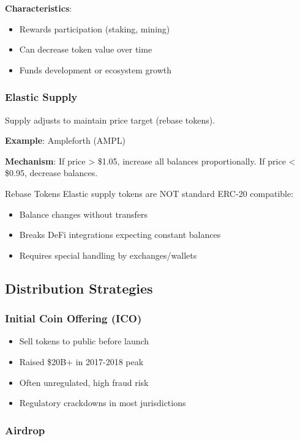 \documentclass[11pt,a4paper]{article}
\begin{document}
\textbf{Characteristics}:
\begin{itemize}
  \item Rewards participation (staking, mining)
  \item Can decrease token value over time
  \item Funds development or ecosystem growth
\end{itemize}

\subsubsection{Elastic Supply}

Supply adjusts to maintain price target (rebase tokens).

\textbf{Example}: Ampleforth (AMPL)

\textbf{Mechanism}: If price > \$1.05, increase all balances proportionally. If price < \$0.95, decrease balances.

\begin{warningbox}{Rebase Tokens}
Elastic supply tokens are NOT standard ERC-20 compatible:
\begin{itemize}
  \item Balance changes without transfers
  \item Breaks DeFi integrations expecting constant balances
  \item Requires special handling by exchanges/wallets
\end{itemize}
\end{warningbox}

\subsection{Distribution Strategies}

\subsubsection{Initial Coin Offering (ICO)}

\begin{itemize}
  \item Sell tokens to public before launch
  \item Raised \$20B+ in 2017-2018 peak
  \item Often unregulated, high fraud risk
  \item Regulatory crackdowns in most jurisdictions
\end{itemize}

\subsubsection{Airdrop}
\end{document}
